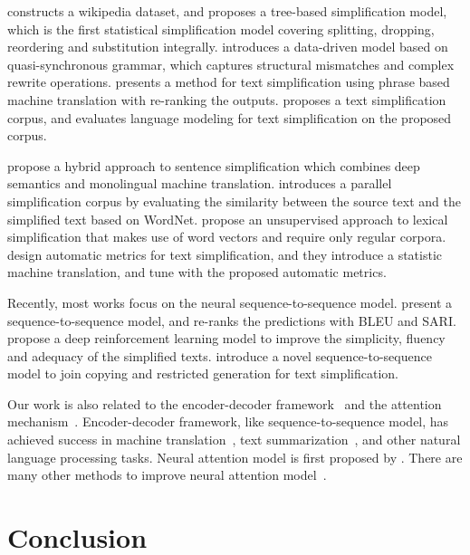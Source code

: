 \documentclass{clv3}
\begin{document}
\begin{CJK*}{UTF8}{gbsn}
 constructs a wikipedia dataset, and proposes a tree-based simplification model, which is the first statistical simplification model covering splitting, dropping, reordering and substitution integrally.  introduces a data-driven model based on quasi-synchronous grammar, which captures structural mismatches and complex rewrite operations.  presents a method for text simplification using phrase based machine translation with re-ranking the outputs.  proposes a text simplification corpus, and evaluates language modeling for text simplification on the proposed corpus.

 propose a hybrid approach to sentence simplification which combines deep semantics and monolingual machine translation.  introduces a parallel simplification corpus by evaluating the similarity between the source text and the simplified text based on WordNet.  propose an unsupervised approach to lexical simplification that makes use of word vectors and require only regular corpora.  design automatic metrics for text simplification, and they introduce a statistic machine translation, and tune with the proposed automatic metrics. 

Recently, most works focus on the neural sequence-to-sequence model.  present a sequence-to-sequence model, and re-ranks the predictions with BLEU and SARI.  propose a deep reinforcement learning model to improve the simplicity, fluency and adequacy of the simplified texts.  introduce a novel sequence-to-sequence model to join copying and restricted generation for text simplification.

Our work is also related to the encoder-decoder framework~\cite{ChoEA2014} and the attention mechanism~\cite{attention}. Encoder-decoder framework, like sequence-to-sequence model, has achieved success in machine translation~\cite{seq2seq,mapattention,stanfordattention}, text summarization~\cite{abs,ras,ibmsummarization,CaoEA2016}, and other natural language processing tasks. Neural attention model is first proposed by . There are many other methods to improve neural attention model~\cite{mapattention,stanfordattention}.


\section{Conclusion}


\end{CJK*}
\end{document}
